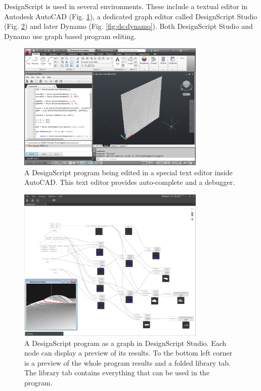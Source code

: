 \documentclass{./llncs2e/llncs}
\begin{document}
	DesignScript is used in several environments. 
	These include a textual editor in Autodesk AutoCAD (Fig. \ref{fig:ds:autocad}), a dedicated graph editor called DesignScript Studio (Fig. \ref{fig:ds:dsstudio}) and later Dynamo (Fig. \ref{fig:ds:dynamo}). 
	Both DesignScript Studio and Dynamo use graph based program editing.
	
	\begin{figure}
		\centering
		\includegraphics[width=0.8\textwidth]{img/ds_autocad}
		\caption{A DesignScript program being edited in a special text editor inside AutoCAD. This text editor provides auto-complete and a debugger.}
		\label{fig:ds:autocad}
	\end{figure} 
	
	\begin{figure}
		\centering
		\includegraphics[width=0.8\textwidth]{img/ds_dsstudio}
		\caption{A DesignScript program as a graph in DesignScript Studio. Each node can display a preview of its results. To the bottom left corner is a preview of the whole program results and a folded library tab. The library tab contains everything that can be used in the program.}
		\label{fig:ds:dsstudio}
	\end{figure} 
	
\end{document}
